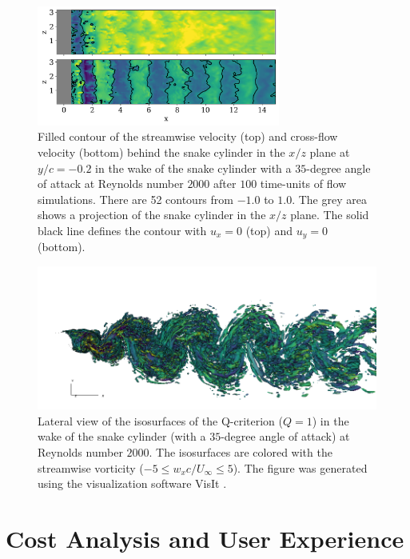 \documentclass[10pt,journal,compsoc]{IEEEtran}
\begin{document}
\begin{figure}
    \centering
    \includegraphics[width=8cm]{ux_uy_xz_plane.png}
    \caption{Filled contour of the streamwise velocity (top) and cross-flow velocity (bottom) behind the snake cylinder in the $x/z$ plane at $y/c=-0.2$ in the wake of the snake cylinder with a $35$-degree angle of attack at Reynolds number $2000$ after $100$ time-units of flow simulations. There are 52 contours from $-1.0$ to $1.0$. The grey area shows a projection of the snake cylinder in the $x/z$ plane. The solid black line defines the contour with $u_x = 0$ (top) and $u_y = 0$ (bottom).}
    \label{fig:ux_uy_xz_plane_3d}
\end{figure}

\begin{figure}[!h]
    \centering
    \includegraphics[width=18cm]{qcrit_wx_wake3d_0020.png}
    \caption{Lateral view of the isosurfaces of the Q-criterion ($Q = 1$) in the wake of the snake cylinder (with a $35$-degree angle of attack) at Reynolds number $2000$. The isosurfaces are colored with the streamwise vorticity ($-5 \leq w_x c / U_\infty \leq 5$). The figure was generated using the visualization software VisIt \cite{childs_et_al_2012}.}
    \label{fig:qcrit_wx_3d}
\end{figure}

\section{Cost Analysis and User Experience}\label{sec:cost}
\end{document}
